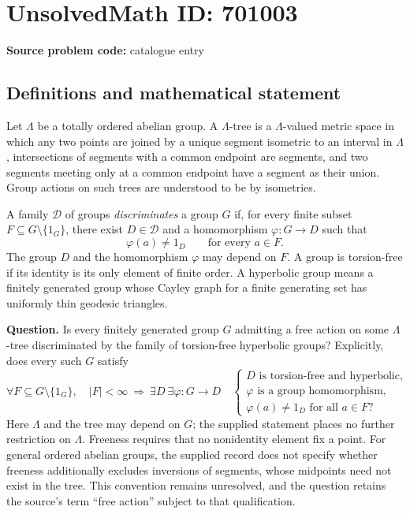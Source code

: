 \documentclass[11pt]{article}
\begin{document}
\section*{UnsolvedMath ID: 701003}
\textbf{Source problem code:} catalogue entry
\subsection{Definitions and mathematical statement}
Let \(\Lambda\) be a totally ordered abelian group. A \(\Lambda\)-tree is a \(\Lambda\)-valued metric space in which any two points are joined by a unique segment isometric to an interval in \(\Lambda\), intersections of segments with a common endpoint are segments, and two segments meeting only at a common endpoint have a segment as their union. Group actions on such trees are understood to be by isometries.

A family \(\mathcal D\) of groups \emph{discriminates} a group \(G\) if, for every finite subset \(F\subseteq G\setminus\{1_G\}\), there exist \(D\in\mathcal D\) and a homomorphism \(\varphi:G\to D\) such that
\[
\varphi(a)\ne 1_D\qquad\text{for every }a\in F.
\]
The group \(D\) and the homomorphism \(\varphi\) may depend on \(F\). A group is torsion-free if its identity is its only element of finite order. A hyperbolic group means a finitely generated group whose Cayley graph for a finite generating set has uniformly thin geodesic triangles.

\textbf{Question.} Is every finitely generated group \(G\) admitting a free action on some \(\Lambda\)-tree discriminated by the family of torsion-free hyperbolic groups? Explicitly, does every such \(G\) satisfy
\[
\forall F\subseteq G\setminus\{1_G\},\quad |F|<\infty
\ \Longrightarrow\ 
\exists D\ \exists\varphi:G\to D
\quad
\begin{cases}
D\text{ is torsion-free and hyperbolic},\\
\varphi\text{ is a group homomorphism},\\
\varphi(a)\ne 1_D\text{ for all }a\in F?
\end{cases}
\]
Here \(\Lambda\) and the tree may depend on \(G\); the supplied statement places no further restriction on \(\Lambda\). Freeness requires that no nonidentity element fix a point. For general ordered abelian groups, the supplied record does not specify whether freeness additionally excludes inversions of segments, whose midpoints need not exist in the tree. This convention remains unresolved, and the question retains the source's term ``free action'' subject to that qualification.
\end{document}
